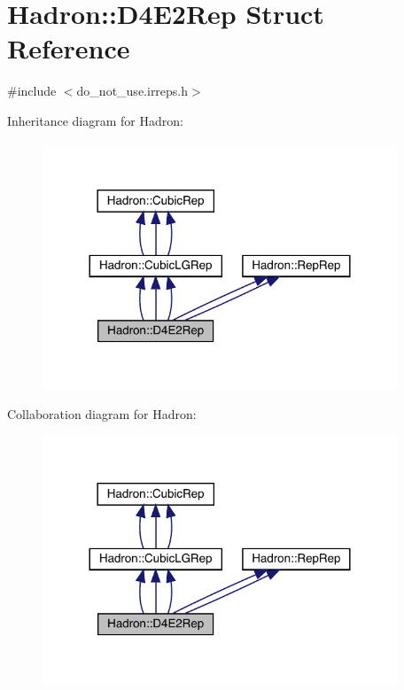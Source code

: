 \hypertarget{structHadron_1_1D4E2Rep}{}\section{Hadron\+:\+:D4\+E2\+Rep Struct Reference}
\label{structHadron_1_1D4E2Rep}


{\ttfamily \#include $<$do\+\_\+not\+\_\+use.\+irreps.\+h$>$}



Inheritance diagram for Hadron\+:
\nopagebreak
\begin{figure}[H]
\begin{center}
\leavevmode
\includegraphics[width=300pt]{de/dfb/structHadron_1_1D4E2Rep__inherit__graph}
\end{center}
\end{figure}


Collaboration diagram for Hadron\+:
\nopagebreak
\begin{figure}[H]
\begin{center}
\leavevmode
\includegraphics[width=300pt]{d0/db0/structHadron_1_1D4E2Rep__coll__graph}
\end{center}
\end{figure}
